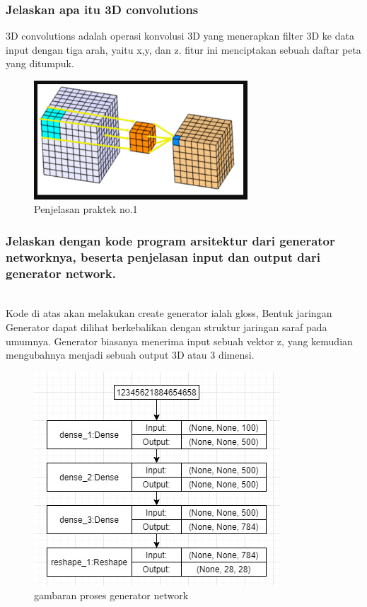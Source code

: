 \subsubsection{Jelaskan apa itu 3D convolutions}
\hfill\break
3D convolutions adalah operasi konvolusi 3D yang menerapkan filter 3D ke data input dengan tiga arah, yaitu x,y, dan z. fitur ini menciptakan sebuah daftar peta yang ditumpuk. 
\begin{figure}[H]
	\centering
	\includegraphics[width=8cm]{figures/1174066/8/no1.png}
	\caption{Penjelasan praktek no.1}
\end{figure}

\subsubsection{Jelaskan dengan kode program arsitektur dari generator networknya, beserta penjelasan input dan output dari generator network.}
\hfill\\

Kode di atas akan melakukan create generator ialah gloss, Bentuk jaringan Generator dapat dilihat berkebalikan dengan struktur jaringan saraf pada umumnya. Generator biasanya menerima input sebuah vektor z, yang kemudian mengubahnya menjadi sebuah output 3D atau 3 dimensi.
\begin{figure}[H]
	\centering
	\includegraphics[scale=0.5]{figures/1174066/8/3a.jpg}
	\caption{gambaran proses generator network}
\end{figure}


